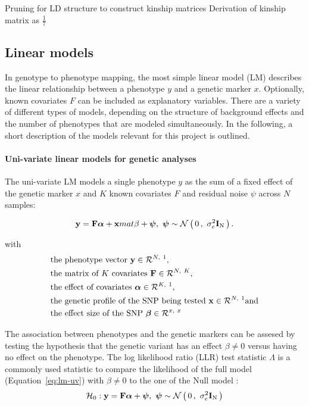 Pruning for LD structure to construct kinship matrices \citep{Eu-ahsunthornwattana2014}
Derivation of kinship matrix as  \(\frac{1}{7}\) \citep{Speed2012}
	
\subsection{Linear models}
In genotype to phenotype mapping, the most simple linear model (LM) describes the linear relationship between a phenotype \(y\) and a genetic marker \(x\). Optionally, known covariates \(F\) can be included as explanatory variables. There are a variety of different types of models, depending on the structure of background effects and the number of phenotypes that are modeled simultaneously. In the following, a short description of the models relevant for this project is outlined. 

\label{sec:ssection:lm}
\paragraph{Uni-variate linear models for genetic analyses}
The uni-variate LM models a single phenotype \(y\) as the sum of a fixed effect of the genetic marker \(x\) and \(K\) known covariates \(F\) and residual noise \(\psi\) across \(N\) samples:

\begin{equation}
\boldsymbol{\mathbf{y}} = \boldsymbol{\mathbf{F}}\boldsymbol{\mathbf{\alpha}} + \boldsymbol{\mathbf{x}}mat{\beta} + \boldsymbol{\mathbf{\psi}},\text{ }
\boldsymbol{\mathbf{\psi}} \sim \mathcal{N}\left(\,{0}\,,~{\sigma_e^2\boldsymbol{\mathbf{I}}_\text{N}}\,\right).
\label{eq:lm-uv}
\end{equation}

with
\begin{align*} 
& \text{the phenotype vector } \boldsymbol{\mathbf{y}} \in \mathcal{R}^{N,~1},\\
& \text{the matrix of $K$ covariates }\boldsymbol{\mathbf{F}} \in \mathcal{R}^{N,~K},\\
& \text{the effect of covariates } \boldsymbol{\mathbf{\alpha}} \in \mathcal{R}^{K,~1},\\
& \text{the genetic profile of the SNP being tested }\boldsymbol{\mathbf{x}} \in \mathcal{R}^{N,~1} \text{and}\\
& \text{the effect size of the SNP } \boldsymbol{\mathbf{\beta}} \in \mathcal{R}^{x,~x} \\
\end{align*} 


\noindent The association between phenotypes and the genetic markers can be assesed by testing the hypothesis that the genetic variant has an effect \(\beta \neq 0\) versus having no effect on the phenotype. The log likelihood ratio (LLR) test statistic \(\Lambda\) is a commonly used statistic to compare the likelihood of the full model \taltH (Equation~\ref{eq:lm-uv}) with \(\beta \neq 0\) to the one of the Null model \tnullH:
\begin{equation}
\mathcal{H}_0: \boldsymbol{\mathbf{y}} =\boldsymbol{\mathbf{F}}\boldsymbol{\mathbf{\alpha}}  + \boldsymbol{\mathbf{\psi}},\text{ }
\boldsymbol{\mathbf{\psi}}\sim \mathcal{N}\left(\,{0}\,,~{\sigma_e^2\boldsymbol{\mathbf{I}}_\text{N}}\,\right)
\label{eq:lm_null}
\end{equation}

